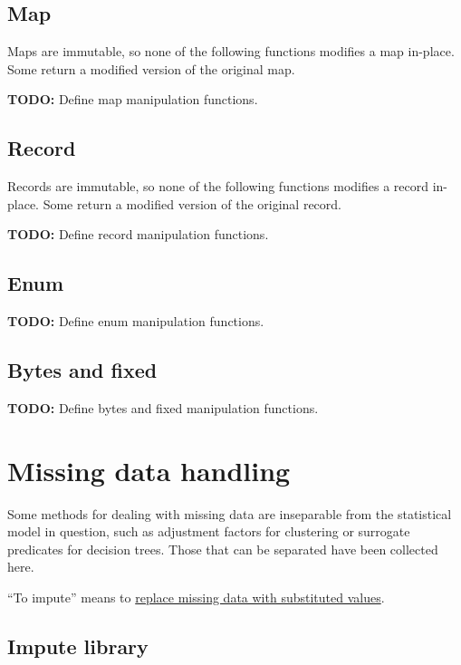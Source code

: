 \documentclass{article}
\theoremstyle{definition}
\begin{document}
\subsection{Map}

Maps are immutable, so none of the following functions modifies a map in-place.  Some return a modified version of the original map.

{\bf TODO:} Define map manipulation functions.

\subsection{Record}

Records are immutable, so none of the following functions modifies a record in-place.  Some return a modified version of the original record.

{\bf TODO:} Define record manipulation functions.

\subsection{Enum}

{\bf TODO:} Define enum manipulation functions.

\subsection{Bytes and fixed}

{\bf TODO:} Define bytes and fixed manipulation functions.

\pagebreak

\section{Missing data handling}

Some methods for dealing with missing data are inseparable from the statistical model in question, such as adjustment factors for clustering or surrogate predicates for decision trees.  Those that can be separated have been collected here.

``To impute'' means to \href{http://en.wikipedia.org/wiki/Imputation_(statistics)}{replace missing data with substituted values}.

\hypertarget{hsec:impute}{}
\subsection{Impute library}
\label{sec:impute}
\end{document}
